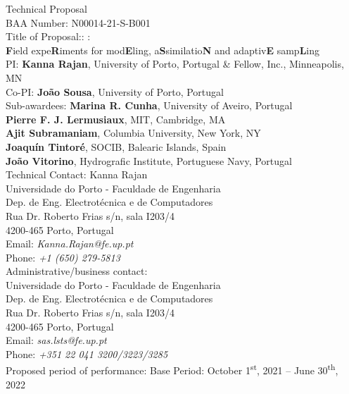 \begin{titlepage}

\begin{center}
\Large
Technical Proposal\\
BAA Number: N00014-21-S-B001\\
Title of Proposal:: \proje:\\\textbf{F}ield expe\textbf{R}iments for mod\textbf{E}ling, a\textbf{S}similatio\textbf{N} and adaptiv\textbf{E} samp\textbf{L}ing\\


\vspace{+1in}
\large
PI: \textbf{Kanna Rajan}, University of Porto, Portugal \& Fellow, \org Inc., Minneapolis, MN\\
Co-PI: \textbf{Jo\~ao Sousa}, University of Porto, Portugal\\
Sub-awardees: 
\textbf{Marina R. Cunha}, University of Aveiro, Portugal\\
\textbf{Pierre F. J. Lermusiaux}, MIT, Cambridge, MA\\
\textbf{Ajit Subramaniam}, Columbia University, New York, NY\\
\textbf{Joaqu\'{i}n Tintor\'{e}}, SOCIB, Balearic Islands, Spain\\
\textbf{Jo\~ao Vitorino}, Hydrografic Institute, Portuguese Navy, Portugal\\
\vspace{+1in}
Technical Contact: Kanna Rajan\\
Universidade do Porto - Faculdade de Engenharia\\
Dep. de Eng. Electrot\'{e}cnica e de Computadores\\
Rua Dr. Roberto Frias s/n, sala I203/4\\
4200-465 Porto, Portugal\\
Email: \emph{Kanna.Rajan@fe.up.pt}\\
Phone: \emph{+1 (650) 279-5813}\\
\vspace{0.5in}
Administrative/business contact: \\
Universidade do Porto - Faculdade de Engenharia\\
Dep. de Eng. Electrot\'{e}cnica e de Computadores\\
Rua Dr. Roberto Frias s/n, sala I203/4\\
4200-465 Porto, Portugal\\
Email: \emph{sas.lsts@fe.up.pt}\\
Phone: \emph{+351 22 041 3200/3223/3285}\\
\vspace{0.5in}
Proposed period of performance: Base Period: October
1\textsuperscript{st}, 2021 -- June 30\textsuperscript{th}, 2022


\end{center}
\end{titlepage}

